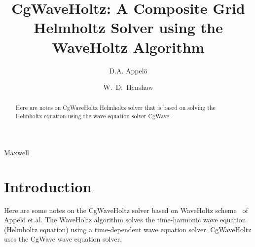 \documentclass[preprint,11pt]{elsarticle}
\begin{document}
\small
{}
\lstset{style=myc}

\begin{frontmatter}
\title{
CgWaveHoltz: A Composite Grid Helmholtz Solver using the WaveHoltz Algorithm
}

\author[cu]{D.A. Appel\"o}
\author[rpi]{W.~D.~Henshaw}

\address[cu]{University of Colorado, Boulder.}
\address[rpi]{Department of Mathematical Sciences, Rensselaer Polytechnic Institute, Troy, NY 12180, USA}





\begin{abstract}

  Here are notes on CgWaveHoltz Helmholtz solver that is based on solving the Helmholtz equation
  using the wave equation solver CgWave.

\end{abstract}

\begin{keyword}
Maxwell
\end{keyword}

\end{frontmatter}


\tableofcontents
%

\section{Introduction}
Here are some notes on the CgWaveHoltz solver based on WaveHoltz scheme~\cite{appelo2019waveholtz} of Appel\"o et.al.
The WaveHoltz algorithm solves the time-harmonic wave equation (Helmholtz equation)
using a time-dependent wave equation solver. CgWaveHoltz uses the CgWave wave equation solver. 
\end{document}
